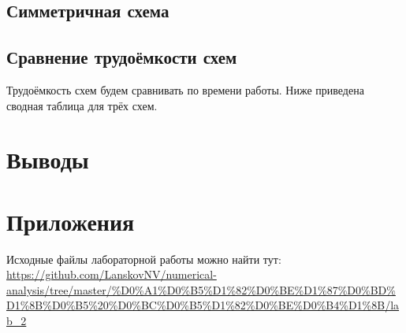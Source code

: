 \documentclass[12pt]{article}
\begin{document}
\subsection{Симметричная схема}
\subsection{Сравнение трудоёмкости схем}

Трудоёмкость схем будем сравнивать по времени работы. Ниже приведена сводная таблица для трёх схем.

\section{Выводы}

\section{Приложения}
Исходные файлы лабораторной работы можно найти тут: \\
\url{https://github.com/LanskovNV/numerical-analysis/tree/master/%D0%A1%D0%B5%D1%82%D0%BE%D1%87%D0%BD%D1%8B%D0%B5%20%D0%BC%D0%B5%D1%82%D0%BE%D0%B4%D1%8B/lab_2}
\end{document}
